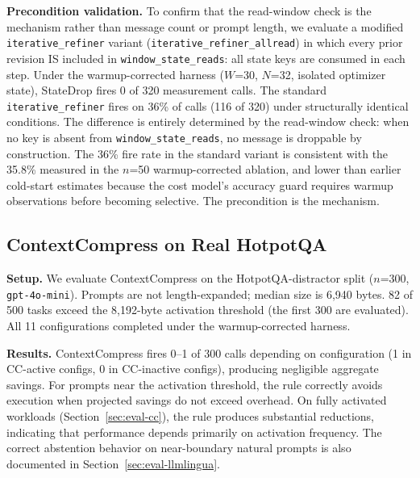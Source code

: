 \documentclass[sigconf,9pt]{acmart}
\begin{document}
\textbf{Precondition validation.}
To confirm that the read-window check is the mechanism rather than message count or
prompt length, we evaluate a modified \texttt{iterative\_refiner} variant
(\texttt{iterative\_refiner\_allread}) in which every prior revision IS included in
\texttt{window\_state\_reads}: all state keys are consumed in each step. Under the
warmup-corrected harness ($W$=30, $N$=32, isolated optimizer state), StateDrop fires
0 of 320 measurement calls. The standard \texttt{iterative\_refiner} fires on 36\%
of calls (116 of 320) under structurally identical conditions. The difference is
entirely determined by the read-window check: when no key is absent from
\texttt{window\_state\_reads}, no message is droppable by construction. The 36\% fire
rate in the standard variant is consistent with the 35.8\% measured in the $n$=50
warmup-corrected ablation, and lower than earlier cold-start estimates because the
cost model's accuracy guard requires warmup observations before becoming selective.
The precondition is the mechanism.

\subsection{ContextCompress on Real HotpotQA}
\label{sec:eval-hotpot}

\textbf{Setup.} We evaluate ContextCompress on the HotpotQA-distractor split ($n$=300,
\texttt{gpt-4o-mini}). Prompts are not length-expanded; median size is 6,940 bytes.
82 of 500 tasks exceed the 8,192-byte activation threshold (the first 300 are
evaluated). All 11 configurations completed under the warmup-corrected harness.

\textbf{Results.} ContextCompress fires 0--1 of 300 calls depending on configuration
(1 in CC-active configs, 0 in CC-inactive configs), producing negligible aggregate
savings. For prompts near the activation threshold, the rule correctly avoids
execution when projected savings do not exceed overhead. On fully activated workloads
(Section~\ref{sec:eval-cc}), the rule produces substantial reductions, indicating that
performance depends primarily on activation frequency. The correct abstention behavior
on near-boundary natural prompts is also documented in
Section~\ref{sec:eval-llmlingua}.
\end{document}
